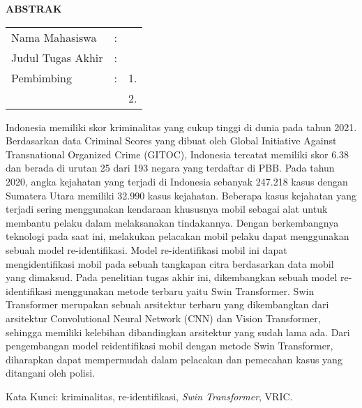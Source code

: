 \begin{center}
  \large\textbf{ABSTRAK}
\end{center}


\vspace{2ex}

\begingroup
\setlength{\tabcolsep}{0pt}

\noindent
\begin{tabularx}{\textwidth}{l >{\centering}m{2em} X}
  Nama Mahasiswa    & : & \name{}         \\

  Judul Tugas Akhir & : & \tatitle{}      \\

  Pembimbing        & : & 1. \advisor{}   \\
                    &   & 2. \coadvisor{} \\
\end{tabularx}
\endgroup

Indonesia memiliki skor kriminalitas yang cukup tinggi di dunia pada tahun 2021. \linebreak 
Berdasarkan data Criminal Scores yang dibuat oleh Global Initiative Against Transnational 
Organized Crime (GITOC), Indonesia tercatat memiliki skor 6.38 dan berada di urutan 25 dari 193
negara yang terdaftar di PBB. Pada tahun 2020, angka kejahatan yang terjadi di Indonesia sebanyak 
247.218 kasus dengan Sumatera Utara memiliki 32.990 kasus kejahatan. Beberapa kasus kejahatan 
yang terjadi sering menggunakan kendaraan khususnya mobil sebagai alat untuk
membantu pelaku dalam melaksanakan tindakannya. Dengan berkembangnya teknologi pada
saat ini, melakukan pelacakan mobil pelaku dapat menggunakan sebuah model re-identifikasi.
Model re-identifikasi mobil ini dapat mengidentifikasi mobil pada sebuah tangkapan citra
berdasarkan data mobil yang dimaksud. Pada penelitian tugas akhir ini, dikembangkan sebuah
model re-identifikasi menggunakan metode terbaru yaitu Swin Transformer. Swin Transformer
merupakan sebuah arsitektur terbaru yang dikembangkan dari arsitektur Convolutional Neural
Network (CNN) dan Vision Transformer, sehingga memiliki kelebihan dibandingkan arsitektur
yang sudah lama ada. Dari pengembangan model reidentifikasi mobil dengan metode Swin
Transformer, diharapkan dapat mempermudah dalam pelacakan dan pemecahan kasus yang ditangani 
oleh polisi.

Kata Kunci: kriminalitas, re-identifikasi, \emph{Swin Transformer}, VRIC.
